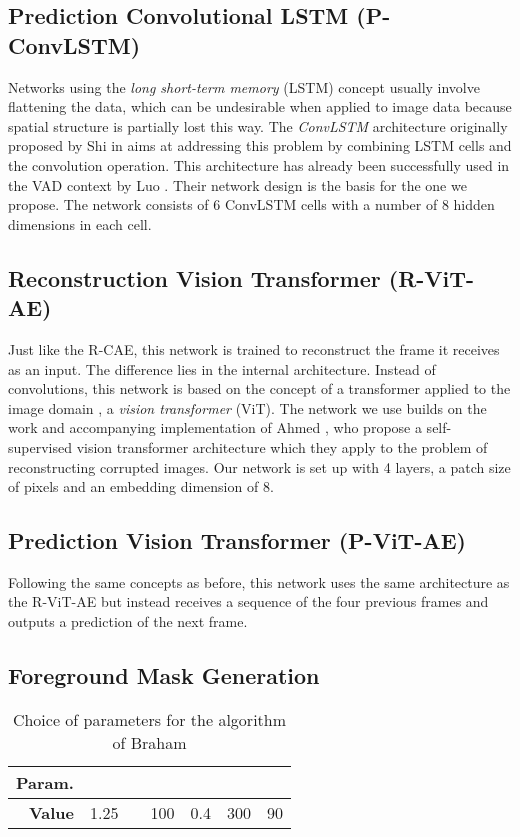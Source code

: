 \documentclass[10pt,twocolumn,letterpaper]{article}
\begin{document}
\subsection{Prediction Convolutional LSTM (P-ConvLSTM)}
Networks using the \emph{long short-term memory} (LSTM) \cite{lstm} concept usually involve flattening the data, which can be undesirable when applied to image data because spatial structure is partially lost this way. The \emph{ConvLSTM} architecture originally proposed by Shi \etal in \cite{convlstm_orig_paper} aims at addressing this problem by combining LSTM cells and the convolution operation. This architecture has already been successfully used in the VAD context by Luo \etal \cite{conv_lstm_ad}. Their network design is the basis for the one we propose. The network consists of \num{6} ConvLSTM cells with a number of \num{8} hidden dimensions in each cell.

\subsection{Reconstruction Vision Transformer (R-ViT-AE)}
Just like the R-CAE, this network is trained to reconstruct the frame it receives as an input. The difference lies in the internal architecture. Instead of convolutions, this network is based on the concept of a transformer applied to the image domain \cite{vision_transformer}, \ie a \emph{vision transformer} (ViT). The network we use builds on the work and accompanying implementation of Ahmed \etal \cite{self-supervised_vision_transformer}, who propose a self-supervised vision transformer architecture which they apply to the problem of reconstructing corrupted images. Our network is set up with \num{4} layers, a patch size of  pixels and an embedding dimension of \num{8}.

\subsection{Prediction Vision Transformer (P-ViT-AE)}
Following the same concepts as before, this network uses the same architecture as the R-ViT-AE but instead receives a sequence of the four previous frames and outputs a prediction of the next frame.

\subsection{Foreground Mask Generation} \label{sec:fg_mask_gen}
\begin{table}[tb]
  \centering
  \begin{tabular}{r|c|c|c|c|c|c}
    \toprule
    \textbf{Param.} &  &  &  &  &  &  \\
    \midrule
    \textbf{Value}     & \num{1.25} &        & \num{100}         & \num{0.4}     & \num{300}  & \num{90} \\
    \bottomrule
  \end{tabular}
  \caption{Choice of parameters for the algorithm of Braham \etal \cite{physically_based_BGS}}
  \label{tab:bgs_parameters}
\end{table}
\end{document}
